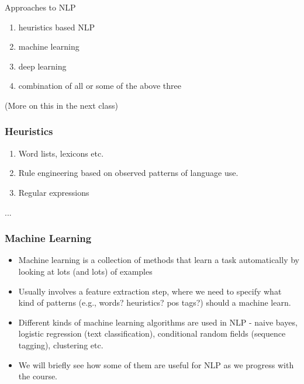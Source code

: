 \documentclass{beamer}
\begin{document}
\begin{frame}{Approaches to NLP}
\begin{enumerate}
    \item heuristics based NLP
    \item machine learning 
    \item deep learning 
    \item combination of all or some of the above three
\end{enumerate}
(More on this in the next class)
\end{frame}

\begin{frame}
\frametitle{Heuristics}
\begin{enumerate}
    \item Word lists, lexicons etc.
    \item Rule engineering based on observed patterns of language use. 
    \item Regular expressions
\end{enumerate}
...
\end{frame}

\begin{frame}
\frametitle{Machine Learning}
\begin{itemize}
    \item Machine learning is a collection of methods that learn a task automatically by looking at lots (and lots) of examples
    \item Usually involves a feature extraction step, where we need to specify what kind of patterns (e.g., words? heuristics? pos tags?) should a machine learn.
    \item Different kinds of machine learning algorithms are used in NLP - naive bayes, logistic regression (text classification), conditional random fields (sequence tagging), clustering etc. 
    \item We will briefly see how some of them are useful for NLP as we progress with the course. 
\end{itemize}
\end{frame}
\end{document}
